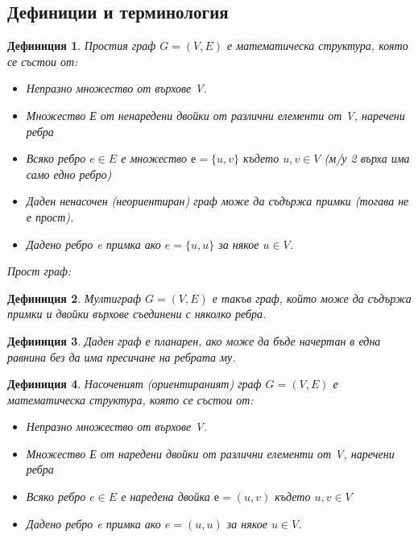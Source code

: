 \documentclass[fleqn, 12pt]{article}
\newtheorem{definition}{Дефиниция}[subsection]
\theoremstyle{definition}
\begin{document}
\subsection{Дефиниции и терминология}

\begin{definition}
Простия	 граф $G = (V,E)$ е математическа структура, която се състои от:
\begin{itemize}
\item Непразно множество от върхове V.
\item Множество Е от ненаредени двойки от различни елементи от V, наречени ребра
\item Всяко ребро $e \in E$ е множество $е = \{ u,v \}$ където $u,v \in V$ (м/у 2 върха има само едно ребро)
\item Даден ненасочен (неориентиран) граф може да съдържа примки (тогава не е прост).
\item Дадено ребро e примка ако $e = \{u, u\}$ за някое $u \in V$.
\end{itemize}
Прост граф:\\
\end{definition}

\begin{definition}
Мултиграф $G = (V, E)$ е такъв граф, който може да съдържа примки и двойки върхове съединени с няколко ребра.
\end{definition}

\begin{definition}
Даден граф е планарен, ако може да бъде начертан в една равнина без да има пресичане на ребрата му.
\end{definition}

\begin{definition}
Насоченият (ориентираният) граф $G = (V, E)$ е математическа структура, която се състои от:
\begin{itemize}
\item Непразно множество от върхове V.
\item Множество Е от наредени двойки от различни елементи от V, наречени ребра
\item Всяко ребро $e \in E$ е наредена двойка $е = ( u, v )$ където $u,v \in V$
\item Дадено ребро e примка ако $e = ( u, u )$ за някое $u \in V$.
\end{itemize}
\end{definition}
\end{document}

